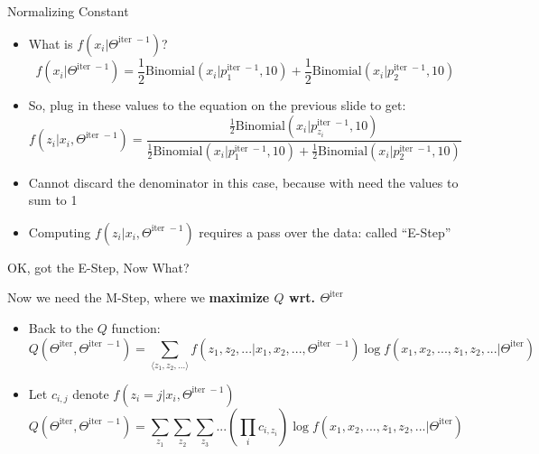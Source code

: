\documentclass[aspectratio=169]{beamer}
\begin{document}
\begin{frame}{Normalizing Constant}

\begin{itemize}
	\item What is $f (x_i | \Theta^{\textrm{iter }-1})$?
		$$f (x_i | \Theta^{\textrm{iter }-1}) = \frac{1}{2} \textrm {Binomial}(x_i | p_{1}^{\textrm{iter }-1}, 10) +
			\frac{1}{2} \textrm{Binomial}(x_i | p_{2}^{\textrm{iter }-1}, 10)$$
	\item So, plug in these values to the equation on the previous slide to get:
		$$f (z_i | x_i, \Theta^{\textrm{iter }-1}) = \frac{\frac{1}{2} \textrm {Binomial}(x_i | p_{z_i}^{\textrm{iter }-1}, 10)}
			{\frac{1}{2} \textrm {Binomial}(x_i | p_{1}^{\textrm{iter }-1}, 10) +
                        \frac{1}{2} \textrm{Binomial}(x_i | p_{2}^{\textrm{iter }-1}, 10)}$$
        \item Cannot discard the denominator in this case, because with need the values to sum to 1 %
	\item Computing $f (z_i | x_i, \Theta^{\textrm{iter }-1})$ requires a pass over the data: called ``E-Step''
	\end{itemize}
\end{frame}
\begin{frame}{OK, got the E-Step, Now What?}

Now we need the M-Step, where we \textbf{maximize $Q$ wrt. $\Theta^{\textrm{iter}}$}
	\begin{itemize}
	\item Back to the $Q$ function:
		$$Q(\Theta^{\textrm{iter}}, \Theta^{\textrm{iter }-1}) =
			\sum_{\langle z_1, z_2, ... \rangle} f (z_1, z_2, ... | x_1,  x_2, ..., \Theta^{\textrm{iter }-1}) 
				\log f (x_1, x_2, ..., z_1, z_2, ... | \Theta^{\textrm{iter}})$$
	\item Let $c_{i, j}$ denote $f (z_i = j | x_i, \Theta^{\textrm{iter }-1})$
	$$Q(\Theta^{\textrm{iter}}, \Theta^{\textrm{iter }-1}) =\sum_{z_1} \sum_{z_2 } \sum_{z_3}... \left( \prod_i c_{i, z_i} \right) \log f (x_1, x_2, ..., z_1, z_2, ... | \Theta^{\textrm{iter}})$$
	\end{itemize}
\end{frame}
\end{document}
